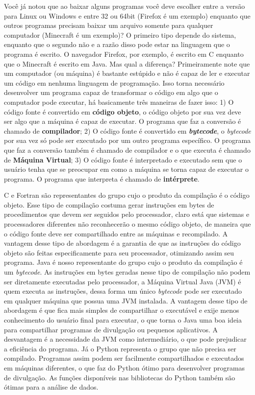 Você já notou que ao baixar alguns programas você deve escolher entre a versão
para Linux ou Windows e entre 32 ou 64bit (Firefox é um exemplo) enquanto que outros programas
precisam baixar um arquivo somente para qualquer computador (Minecraft é um exemplo)?
O primeiro tipo depende do sistema, enquanto que o segundo não e a razão disso
pode estar na linguagem que o programa é escrito.
O navegador Firefox, por exemplo, é escrito em C enquanto que o Minecraft é escrito
em Java. Mas qual a diferença?
Primeiramente note que um computador (ou máquina) é bastante estúpido e não é capaz de ler
e executar um código em nenhuma linguagem de programação.
Isso torna necessário desenvolver um programa capaz de transformar o código
em algo que o computador pode executar, há basicamente três maneiras de fazer isso:
1) O código fonte é convertido em \textbf{código objeto}, o código objeto por sua vez deve
ser algo que a máquina é capaz de executar. O programa que faz a conversão
é chamado de \textbf{compilador};
2) O código fonte é convertido em \textit{\bfseries bytecode}, o
\textit{bytecode} por sua vez só pode ser executado por um outro programa específico.
O programa que faz a conversão também é chamado de compilador
e o que executa é chamado de \textbf{Máquina Virtual};
3) O código fonte é interpretado e executado sem que o usuário tenha que se preocupar
em como a máquina se torna capaz de executar o programa.
O programa que interpreta é chamado de \textbf{intérprete}.

C e Fortran são representantes do grupo cujo o produto da compilação é
o código objeto. Esse tipo de compilação costuma gerar instruções em bytes
de procedimentos que devem ser seguidos pelo processador, claro está que
sistemas e processadores diferentes não reconhecerão o mesmo código objeto,
de maneira que o código fonte deve ser compartilhado entre as máquinas
e recompilado. A vantagem desse tipo de abordagem é a garantia de que as
instruções do código objeto são feitas especificamente para seu processador, otimizando
assim seu programa.
Java é nosso representante do grupo cujo o produto da compilação é um \textit{bytecode}.
As instruções em bytes geradas nesse tipo de compilação não podem ser diretamente
executadas pelo processador, a Máquina Virtual Java (JVM) é quem executa as instruções,
dessa forma um único \textit{bytecode} pode ser executado em qualquer máquina
que possua uma JVM instalada.
A vantagem desse tipo de abordagem é que fica mais simples de compartilhar o
executável e exije menos conhecimento do usuário final para executar,
o que torna o Java uma boa ideia para compartilhar programas de divulgação
ou pequenos aplicativos. A desvantagem é a necessidade da JVM como intermediário,
o que pode prejudicar a eficiência do programa.
Já o Python representa o grupo que não precisa ser compilado.
Programas assim podem ser facilmente compartilhados e executados em máquinas
diferentes, o que faz do Python ótimo para desenvolver programas de divulgação.
As funções disponíveis nas bibliotecas do Python também são ótimas para a
análise de dados.

